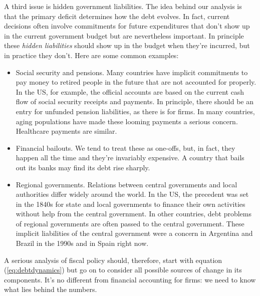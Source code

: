 A third issue is hidden government liabilities.  
The idea behind our analysis
is that the primary deficit determines how the debt evolves.
In fact, current decisions often involve commitments
for future expenditures that don't show up in the
current government budget but are nevertheless important.
In principle these {\it hidden liabilities\/}
should show up in the budget when they're incurred,
but in practice they don't.
Here are some common examples:
%
\begin{itemize}
\item Social security and pensions. 
%
Many countries have implicit commitments to pay
money to retired people in the future
that are not accounted for properly.
In the US, for example, the official accounts are based on
the current cash flow of
social security receipts and payments.
In principle, there should be an entry for unfunded pension
liabilities,
as there is for firms.
In many countries, aging populations have made these looming payments
a serious concern.
Healthcare payments are similar.

\item Financial bailouts.  
%
We tend to treat these as one-offs, but, in fact, they happen all the time and they're invariably expensive.
A country that bails out its banks may find its debt rise sharply.

\item Regional governments.  
%
Relations between central governments and local authorities
differ widely around the world.
In the US, the precedent was set in the 1840s for state and local
governments to finance their own activities without help from
the central government.
In other countries, debt problems of regional governments are often
passed to the central government.
These implicit liabilities of the central government were a concern in
Argentina and Brazil in the 1990s and in Spain right now.

\end{itemize}

A serious analysis of fiscal policy should, therefore,
start with equation (\ref{eq:debtdynamics})
but go on to consider all possible sources of change in its components.
It's no different from financial accounting
 for firms:
we need to know what lies behind the numbers.



